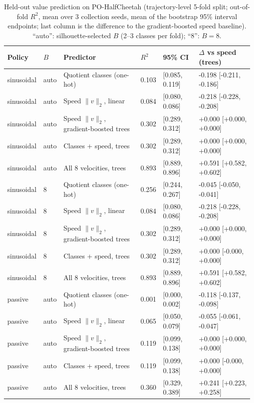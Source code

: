 \documentclass[10pt]{article}
\begin{document}
\begin{table}[t]
\centering
\small
\caption{Held-out value prediction on PO-HalfCheetah (trajectory-level 5-fold
  split; out-of-fold $R^2$, mean over 3 collection seeds, mean of the
  bootstrap 95\% interval endpoints; last column is the difference to the
  gradient-boosted speed baseline).  ``auto'': silhouette-selected $B$ (2--3
  classes per fold); ``8'': $B=8$.}
\label{tab:hcsplit}
\begin{tabular}{llllll}
\toprule
Policy & $B$ & Predictor & $R^2$ & 95\% CI & $\Delta$ vs speed (trees) \\
\midrule
sinusoidal & auto & Quotient classes (one-hot) & 0.103 & [0.085, 0.119] & -0.198 [-0.211, -0.186] \\
sinusoidal & auto & Speed $\|v\|_2$, linear & 0.084 & [0.080, 0.086] & -0.218 [-0.228, -0.208] \\
sinusoidal & auto & Speed $\|v\|_2$, gradient-boosted trees & 0.302 & [0.289, 0.312] & +0.000 [+0.000, +0.000] \\
sinusoidal & auto & Classes + speed, trees & 0.302 & [0.289, 0.312] & +0.000 [+0.000, +0.000] \\
sinusoidal & auto & All 8 velocities, trees & 0.893 & [0.889, 0.896] & +0.591 [+0.582, +0.602] \\
sinusoidal & 8 & Quotient classes (one-hot) & 0.256 & [0.244, 0.267] & -0.045 [-0.050, -0.041] \\
sinusoidal & 8 & Speed $\|v\|_2$, linear & 0.084 & [0.080, 0.086] & -0.218 [-0.228, -0.208] \\
sinusoidal & 8 & Speed $\|v\|_2$, gradient-boosted trees & 0.302 & [0.289, 0.312] & +0.000 [+0.000, +0.000] \\
sinusoidal & 8 & Classes + speed, trees & 0.302 & [0.289, 0.312] & +0.000 [-0.000, +0.000] \\
sinusoidal & 8 & All 8 velocities, trees & 0.893 & [0.889, 0.896] & +0.591 [+0.582, +0.602] \\
passive & auto & Quotient classes (one-hot) & 0.001 & [0.000, 0.002] & -0.118 [-0.137, -0.098] \\
passive & auto & Speed $\|v\|_2$, linear & 0.065 & [0.050, 0.079] & -0.055 [-0.061, -0.047] \\
passive & auto & Speed $\|v\|_2$, gradient-boosted trees & 0.119 & [0.099, 0.138] & +0.000 [+0.000, +0.000] \\
passive & auto & Classes + speed, trees & 0.119 & [0.099, 0.138] & +0.000 [-0.000, +0.000] \\
passive & auto & All 8 velocities, trees & 0.360 & [0.329, 0.389] & +0.241 [+0.223, +0.258] \\

\end{tabular}
\end{table}
\end{document}
